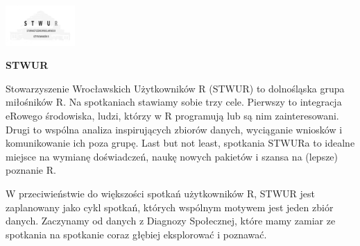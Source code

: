 \documentclass[\main/boa.tex]{subfiles}
\begin{document}
	
	\begin{minipage}[t]{0.915\textwidth}
		\center     
		\includegraphics[width=100px]{img/logos.bw/stwur.png} 
	\end{minipage}
	
	\Large \textbf {STWUR}
	
	
	\vskip 0.3cm
	\normalsize 
	Stowarzyszenie Wrocławskich Użytkowników R (STWUR) to dolnośląska grupa miłośników R. Na spotkaniach stawiamy sobie trzy cele. Pierwszy to integracja eRowego środowiska, ludzi, którzy w R programują lub są nim zainteresowani. Drugi to wspólna analiza inspirujących zbiorów danych, wyciąganie wniosków i komunikowanie ich poza grupę. Last but not least, spotkania STWURa to idealne miejsce na wymianę doświadczeń, naukę nowych pakietów i szansa na (lepsze) poznanie R.
	
	W przeciwieństwie do większości spotkań użytkowników R, STWUR jest zaplanowany jako cykl spotkań, których wspólnym motywem jest jeden zbiór danych. Zaczynamy od danych z Diagnozy Społecznej, które mamy zamiar ze spotkania na spotkanie coraz głębiej eksplorować i poznawać.
	
\end{document}
